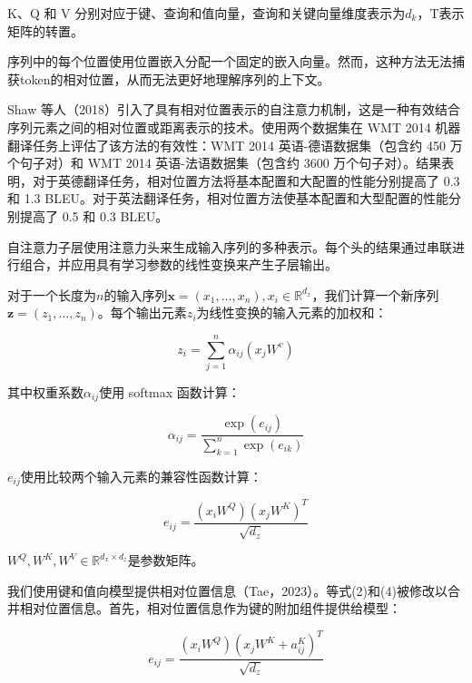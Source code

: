 \begin{translation}
K、Q 和 V 分别对应于键、查询和值向量，查询和关键向量维度表示为$d_k$，T表示矩阵的转置。

序列中的每个位置使用位置嵌入分配一个固定的嵌入向量。然而，这种方法无法捕获token的相对位置，从而无法更好地理解序列的上下文。

Shaw 等人（2018）引入了具有相对位置表示的自注意力机制，这是一种有效结合序列元素之间的相对位置或距离表示的技术。使用两个数据集在 WMT 2014 机器翻译任务上评估了该方法的有效性：WMT 2014 英语-德语数据集（包含约 450 万个句子对）和 WMT 2014 英语-法语数据集（包含约 3600 万个句子对）。结果表明，对于英德翻译任务，相对位置方法将基本配置和大配置的性能分别提高了 0.3 和 1.3 BLEU。对于英法翻译任务，相对位置方法使基本配置和大型配置的性能分别提高了 0.5 和 0.3 BLEU。

自注意力子层使用注意力头来生成输入序列的多种表示。每个头的结果通过串联进行组合，并应用具有学习参数的线性变换来产生子层输出。

对于一个长度为$n$的输入序列$\boldsymbol{x} = \left( x_1, \ldots, x_n \right), x_i \in \mathbb{R}^{d_x}$，我们计算一个新序列$\boldsymbol{z} = \left( z_1, \ldots, z_n \right)$。每个输出元素$z_i$为线性变换的输入元素的加权和：

\begin{equation}
  z_i = \sum_{j=1}^n \alpha_{ij} \left( x_jW^{v} \right)
\end{equation}

其中权重系数$\alpha_{ij}$使用 softmax 函数计算：

\begin{equation}
  \alpha_{ij} = \frac{\exp \left( e_{ij} \right)}{\sum_{k=1}^n \exp \left( e_{ik} \right)}
\end{equation}

$e_{ij}$使用比较两个输入元素的兼容性函数计算：

\begin{equation}
  e_{ij} = \frac{\left( x_iW^{Q} \right) \left( x_jW^{K} \right)^T}{\sqrt{d_z}}
\end{equation}

$W^Q, W^K, W^V \in \mathbb{R}^{d_x  \times d_z}$是参数矩阵。

我们使用键和值向模型提供相对位置信息（Tae，2023）。等式(2)和(4)被修改以合并相对位置信息。首先，相对位置信息作为键的附加组件提供给模型：

\begin{equation}
  e_{ij} = \frac{\left( x_iW^{Q} \right) \left( x_jW^{K} + a_{ij}^K \right)^T}{\sqrt{d_z}}
\end{equation}


\end{translation}
